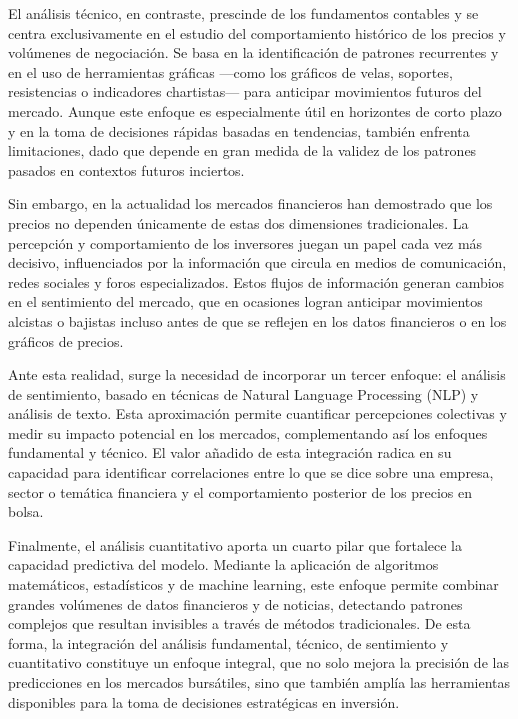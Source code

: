 \documentclass[letterpaper,10pt,spanish]{sphinxmanual}
\begin{document}
\sphinxAtStartPar
El análisis técnico, en contraste, prescinde de los fundamentos contables y se centra exclusivamente en el estudio del comportamiento histórico de los precios y volúmenes de negociación. Se basa en la identificación de patrones recurrentes y en el uso de herramientas gráficas —como los gráficos de velas, soportes, resistencias o indicadores chartistas— para anticipar movimientos futuros del mercado. Aunque este enfoque es especialmente útil en horizontes de corto plazo y en la toma de decisiones rápidas basadas en tendencias, también enfrenta limitaciones, dado que depende en gran medida de la validez de los patrones pasados en contextos futuros inciertos.

\sphinxAtStartPar
Sin embargo, en la actualidad los mercados financieros han demostrado que los precios no dependen únicamente de estas dos dimensiones tradicionales. La percepción y comportamiento de los inversores juegan un papel cada vez más decisivo, influenciados por la información que circula en medios de comunicación, redes sociales y foros especializados. Estos flujos de información generan cambios en el sentimiento del mercado, que en ocasiones logran anticipar movimientos alcistas o bajistas incluso antes de que se reflejen en los datos financieros o en los gráficos de precios.

\sphinxAtStartPar
Ante esta realidad, surge la necesidad de incorporar un tercer enfoque: el análisis de sentimiento, basado en técnicas de Natural Language Processing (NLP) y análisis de texto. Esta aproximación permite cuantificar percepciones colectivas y medir su impacto potencial en los mercados, complementando así los enfoques fundamental y técnico. El valor añadido de esta integración radica en su capacidad para identificar correlaciones entre lo que se dice sobre una empresa, sector o temática financiera y el comportamiento posterior de los precios en bolsa.

\sphinxAtStartPar
Finalmente, el análisis cuantitativo aporta un cuarto pilar que fortalece la capacidad predictiva del modelo. Mediante la aplicación de algoritmos matemáticos, estadísticos y de machine learning, este enfoque permite combinar grandes volúmenes de datos financieros y de noticias, detectando patrones complejos que resultan invisibles a través de métodos tradicionales. De esta forma, la integración del análisis fundamental, técnico, de sentimiento y cuantitativo constituye un enfoque integral, que no solo mejora la precisión de las predicciones en los mercados bursátiles, sino que también amplía las herramientas disponibles para la toma de decisiones estratégicas en inversión.
\end{document}
